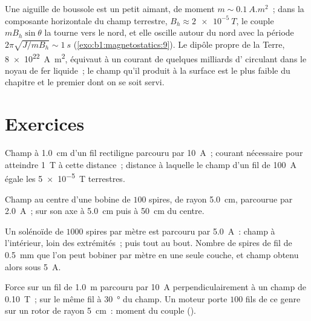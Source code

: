 \begin{example}\label{ex:b1:magnetostatics:compass}
Une aiguille de boussole est un petit aimant, de moment $m \sim \qty{0.1}{A.m^2}$~;
dans la composante horizontale du champ terrestre, $B_h \approx \qty{2e-5}{T}$, le
couple $mB_h\sin\theta$ la tourne vers le nord, et elle oscille autour du nord avec
la période $2\pi\sqrt{J/mB_h} \sim \qty{1}{s}$ (\cref{exo:b1:magnetostatics:9}).
Le dipôle propre de la Terre, \qty{8e22}{A.m^2}, équivaut à un courant de
quelques milliards d' circulant dans le noyau de fer liquide~; le champ
qu'il produit à la surface est le plus faible du chapitre et le premier dont
on se soit servi.
\end{example}

\section{Exercices}

\begin{exercise}[$\star$]\label{exo:b1:magnetostatics:1}
Champ à \qty{1.0}{cm} d'un fil rectiligne parcouru par \qty{10}{A}~; courant
nécessaire pour atteindre \qty{1}{T} à cette distance~; distance à laquelle le
champ d'un fil de \qty{100}{A} égale les \qty{5e-5}{T} terrestres.
\end{exercise}

\begin{exercise}[$\star$]\label{exo:b1:magnetostatics:2}
Champ au centre d'une bobine de $100$ spires, de rayon \qty{5.0}{cm},
parcourue par \qty{2.0}{A}~; sur son axe à \qty{5.0}{cm} puis à \qty{50}{cm}
du centre.
\end{exercise}

\begin{exercise}[$\star$]\label{exo:b1:magnetostatics:3}
Un solénoïde de $1000$ spires par mètre est parcouru par \qty{5.0}{A}~: champ
à l'intérieur, loin des extrémités~; puis tout au bout. Nombre de spires de
fil de \qty{0.5}{mm} que l'on peut bobiner par mètre en une seule couche, et
champ obtenu alors sous \qty{5}{A}.
\end{exercise}

\begin{exercise}[$\star$]\label{exo:b1:magnetostatics:4}
Force sur un fil de \qty{1.0}{m} parcouru par \qty{10}{A} perpendiculairement
à un champ de \qty{0.10}{T}~; sur le même fil à \qty{30}{\degree} du champ. Un
moteur porte $100$ fils de ce genre sur un rotor de rayon \qty{5}{cm}~: moment
du couple ().
\end{exercise}

